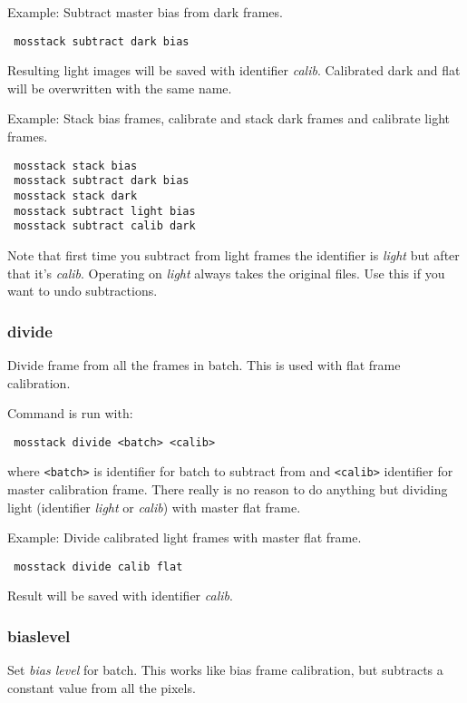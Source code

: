 \documentclass[twoside,a4paper]{refart}
\begin{document}
Example: Subtract master bias from dark frames.

\begin{verbatim}
 mosstack subtract dark bias
\end{verbatim}

Resulting light images will be saved with identifier \textit{calib}. Calibrated dark and flat will be overwritten
with the same name.

Example: Stack bias frames, calibrate and stack dark frames and calibrate light frames.

\begin{verbatim}
 mosstack stack bias
 mosstack subtract dark bias
 mosstack stack dark
 mosstack subtract light bias
 mosstack subtract calib dark
\end{verbatim}

Note that first time you subtract from light frames the identifier is \textit{light} but after that it's \textit{calib}.
Operating on \textit{light} always takes the original files. Use this if you want to undo subtractions.



\subsubsection{divide}
Divide frame from all the frames in batch. This is used with flat frame calibration.

Command is run with:

\begin{verbatim}
 mosstack divide <batch> <calib>
\end{verbatim}

where \texttt{<batch>} is identifier for batch to subtract from and \texttt{<calib>} identifier for master 
calibration frame. There really is no reason to do anything but dividing light (identifier \textit{light}
or \textit{calib}) with master flat frame.

Example: Divide calibrated light frames with master flat frame.

\begin{verbatim}
 mosstack divide calib flat
\end{verbatim}

Result will be saved with identifier \textit{calib}. 


\subsubsection{biaslevel}
Set \textit{bias level} for batch. This works like bias frame calibration, but subtracts a constant value
from all the pixels.
\end{document}
